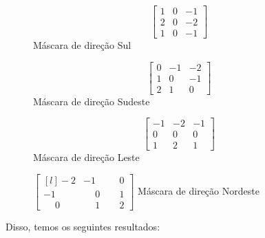 \documentclass[a4paper, 12pt]{article}
\begin{document}
\begin{figure}[!htb]
	\begin{minipage}{.23\linewidth}
	  \centering
	  \[\left[\begin{array}{ccc}
		1 & 0 & -1 \\
		2 & 0 & -2 \\
		1 & 0 & -1
	  \end{array}\right]\]
	  Máscara de direção Sul
	\end{minipage}%
	\begin{minipage}{.23\linewidth}
	  \centering
	  \[\left[\begin{array}{ccc}
		0 & -1  & -2 \\
		1 &  0  & -1 \\
		2 &  1  &  0
	  \end{array}\right]\]
	  Máscara de direção Sudeste
	\end{minipage}
	\begin{minipage}{.23\linewidth}
		\centering
		\[\left[\begin{array}{ccc}
		  -1 &  -2  & -1 \\
		   0 &   0  &  0 \\
		   1 &   2  &  1
		\end{array}\right]\]
		Máscara de direção Leste
	  \end{minipage}
	  \begin{minipage}{.23\linewidth}
		\centering
		$
		\begin{bmatrix*}[l]
		             -2 &            -1   & \phantom{-}  0 \\
		             -1 &  \phantom{-}0   & \phantom{-}  1 \\
		   \phantom{-}0 &  \phantom{-}1   & \phantom{-}  2
		\end{bmatrix*}
		$
		Máscara de direção Nordeste
	  \end{minipage}
  \end{figure}
Disso, temos os seguintes resultados:
\end{document}
